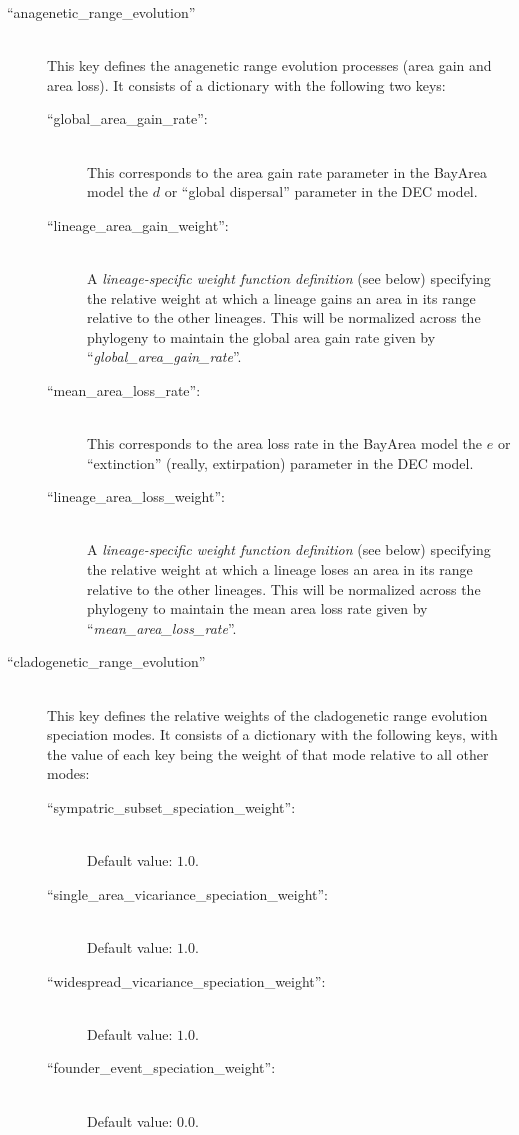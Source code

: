 \documentclass[11pt,openany]{memoir} %
\begin{document}
\begin{description}
    \item[``anagenetic\_range\_evolution'']  \hfill \\
        This key defines the anagenetic range evolution processes (area gain and area loss).
        It consists of a dictionary with the following two keys:
        \begin{description}
            \item[``global\_area\_gain\_rate'':] \hfill \\
                This corresponds to the area gain rate parameter in the BayArea model the $d$ or ``global dispersal'' parameter in the DEC model.
            \item[``lineage\_area\_gain\_weight'':] \hfill \\
                A \textit{lineage-specific weight function definition} (see below) specifying the relative weight at which a lineage gains an area in its range relative to the other lineages.
                This will be normalized across the phylogeny to maintain the global area gain rate given by ``\textit{global\_area\_gain\_rate}''.
            \item[``mean\_area\_loss\_rate'':] \hfill \\
                This corresponds to the area loss rate in the BayArea model the $e$ or ``extinction'' (really, extirpation) parameter in the DEC model.
            \item[``lineage\_area\_loss\_weight'':] \hfill \\
                A \textit{lineage-specific weight function definition} (see below) specifying the relative weight at which a lineage loses an area in its range relative to the other lineages.
                This will be normalized across the phylogeny to maintain the mean area loss rate given by ``\textit{mean\_area\_loss\_rate}''.
        \end{description}

    \item[``cladogenetic\_range\_evolution'']  \hfill \\
        This key defines the relative weights of the cladogenetic range evolution speciation modes.
        It consists of a dictionary with the following keys, with the value of each key being the weight of that mode relative to all other modes:
        \begin{description}
            \item[``sympatric\_subset\_speciation\_weight'':] \hfill \\
                Default value: $1.0$.
            \item[``single\_area\_vicariance\_speciation\_weight'':] \hfill \\
                Default value: $1.0$.
            \item[``widespread\_vicariance\_speciation\_weight'':] \hfill \\
                Default value: $1.0$.
            \item[``founder\_event\_speciation\_weight'':] \hfill \\
                Default value: $0.0$.
        \end{description}


\end{description}
\end{document}
